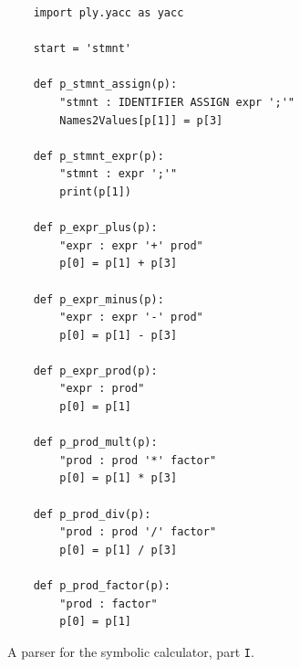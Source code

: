 \begin{figure}[!ht]
\centering
\begin{verbatim}
    import ply.yacc as yacc
    
    start = 'stmnt'
    
    def p_stmnt_assign(p):
        "stmnt : IDENTIFIER ASSIGN expr ';'"
        Names2Values[p[1]] = p[3]
        
    def p_stmnt_expr(p):
        "stmnt : expr ';'"
        print(p[1])
        
    def p_expr_plus(p):
        "expr : expr '+' prod"
        p[0] = p[1] + p[3]
        
    def p_expr_minus(p):
        "expr : expr '-' prod"
        p[0] = p[1] - p[3]
        
    def p_expr_prod(p):
        "expr : prod"
        p[0] = p[1]
        
    def p_prod_mult(p):
        "prod : prod '*' factor"
        p[0] = p[1] * p[3]
        
    def p_prod_div(p):
        "prod : prod '/' factor"
        p[0] = p[1] / p[3]
        
    def p_prod_factor(p):
        "prod : factor"
        p[0] = p[1]
\end{verbatim}
\vspace*{-0.3cm}
\caption{A parser for the symbolic calculator, part \texttt{I}.}
\label{fig:Symbolic-Calculator.ipynb:yacc}
\end{figure}

